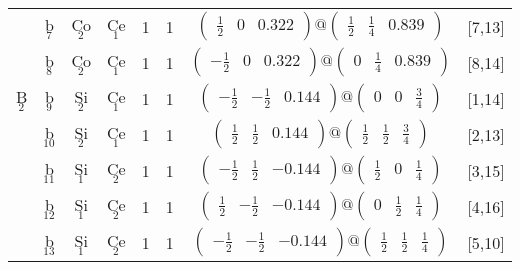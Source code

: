 \documentclass[fleqn,10pt,landscape]{article}
\begin{document}
\begin{itemize}
\begin{center}
\begin{longtable}{cc|cc|c|c|c|l}
& b$_{7}$ & Co$_{2}$ & Ce$_{1}$ & 1 & 1 & $\begin{pmatrix} \frac{1}{2} & 0 & 0.322 \end{pmatrix}@\begin{pmatrix} \frac{1}{2} & \frac{1}{4} & 0.839 \end{pmatrix}$ & [7,13] \\
& b$_{8}$ & Co$_{2}$ & Ce$_{1}$ & 1 & 1 & $\begin{pmatrix} - \frac{1}{2} & 0 & 0.322 \end{pmatrix}@\begin{pmatrix} 0 & \frac{1}{4} & 0.839 \end{pmatrix}$ & [8,14] \\ \hline
B$_{2}$ & b$_{9}$ & Si$_{2}$ & Ce$_{1}$ & 1 & 1 & $\begin{pmatrix} - \frac{1}{2} & - \frac{1}{2} & 0.144 \end{pmatrix}@\begin{pmatrix} 0 & 0 & \frac{3}{4} \end{pmatrix}$ & [1,14] \\
& b$_{10}$ & Si$_{2}$ & Ce$_{1}$ & 1 & 1 & $\begin{pmatrix} \frac{1}{2} & \frac{1}{2} & 0.144 \end{pmatrix}@\begin{pmatrix} \frac{1}{2} & \frac{1}{2} & \frac{3}{4} \end{pmatrix}$ & [2,13] \\
& b$_{11}$ & Si$_{1}$ & Ce$_{2}$ & 1 & 1 & $\begin{pmatrix} - \frac{1}{2} & \frac{1}{2} & -0.144 \end{pmatrix}@\begin{pmatrix} \frac{1}{2} & 0 & \frac{1}{4} \end{pmatrix}$ & [3,15] \\
& b$_{12}$ & Si$_{1}$ & Ce$_{2}$ & 1 & 1 & $\begin{pmatrix} \frac{1}{2} & - \frac{1}{2} & -0.144 \end{pmatrix}@\begin{pmatrix} 0 & \frac{1}{2} & \frac{1}{4} \end{pmatrix}$ & [4,16] \\
& b$_{13}$ & Si$_{1}$ & Ce$_{2}$ & 1 & 1 & $\begin{pmatrix} - \frac{1}{2} & - \frac{1}{2} & -0.144 \end{pmatrix}@\begin{pmatrix} \frac{1}{2} & \frac{1}{2} & \frac{1}{4} \end{pmatrix}$ & [5,10] \\

\end{longtable}
\end{center}
\end{itemize}
\end{document}
